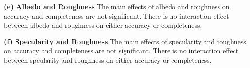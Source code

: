 
\textbf{(e) Albedo and Roughness}
The main effects of albedo and roughness on accuracy and completeness are not significant. There is no interaction effect between albedo and roughness on either accuracy or completeness.

\textbf{(f) Specularity and Roughness} 
The main effects of specularity and roughness on accuracy and completeness are not significant. There is no interaction effect between spcularity and roughness on either accuracy or completeness.


